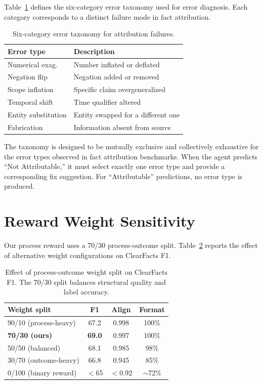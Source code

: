 \documentclass{article}
\begin{document}
Table~\ref{tab:error_taxonomy} defines the six-category error taxonomy used for error diagnosis.
Each category corresponds to a distinct failure mode in fact attribution.

\begin{table}[h]
\centering
\small
\caption{Six-category error taxonomy for attribution failures.}
\label{tab:error_taxonomy}
\begin{tabular}{ll}
\toprule
\textbf{Error type} & \textbf{Description} \\
\midrule
Numerical exag. & Number inflated or deflated \\
Negation flip & Negation added or removed \\
Scope inflation & Specific claim overgeneralized \\
Temporal shift & Time qualifier altered \\
Entity substitution & Entity swapped for a different one \\
Fabrication & Information absent from source \\
\bottomrule
\end{tabular}
\end{table}

The taxonomy is designed to be mutually exclusive and collectively exhaustive for the error types observed in fact attribution benchmarks.
When the agent predicts ``Not Attributable,'' it must select exactly one error type and provide a corresponding fix suggestion.
For ``Attributable'' predictions, no error type is produced.


\section{Reward Weight Sensitivity}
\label{app:weight_sensitivity}

Our process reward uses a 70/30 process-outcome split.
Table~\ref{tab:weight_sensitivity} reports the effect of alternative weight configurations on ClearFacts F1.

\begin{table}[h]
\centering
\small
\caption{Effect of process-outcome weight split on ClearFacts F1. The 70/30 split balances structural quality and label accuracy.}
\label{tab:weight_sensitivity}
\begin{tabular}{lccc}
\toprule
\textbf{Weight split} & \textbf{F1} & \textbf{Align} & \textbf{Format} \\
\midrule
90/10 (process-heavy) & 67.2 & 0.998 & 100\% \\
\textbf{70/30 (ours)} & \textbf{69.0} & 0.997 & 100\% \\
50/50 (balanced) & 68.1 & 0.985 & 98\% \\
30/70 (outcome-heavy) & 66.8 & 0.945 & 85\% \\
0/100 (binary reward) & $<$65 & $<$0.92 & $\sim$72\% \\
\bottomrule
\end{tabular}
\end{table}
\end{document}
